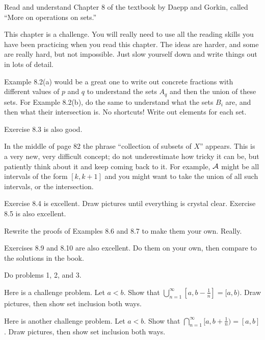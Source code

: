 
Read and understand Chapter 8 of the textbook by Daepp and Gorkin, called ``More on operations on sets.''

This chapter is a challenge.
You will really need to use all the reading skills you have been practicing when you read this chapter.
The ideas are harder, and some are really hard, but not impossible.
Just slow yourself down and write things out in lots of detail.

Example 8.2(a) would be a great one to write out concrete fractions with different values of $p$ and $q$ to understand the sets $A_q$ and then the union of these sets.  For Example 8.2(b), do the same to understand what the sets $B_i$ are, and then what their intersection is.  No shortcuts!  Write out elements for each set.

Exercise 8.3 is also good.

In the middle of page 82 the phrase ``collection of subsets of $X$'' appears.
This is a very new, very difficult concept; do not underestimate how tricky it can be, but patiently think about it and keep coming back to it.
For example, $\cal{A}$ might be all intervals of the form $[k,k+1]$ and you might want to take the union of all such intervals, or the intersection.

Exercise 8.4 is excellent.  Draw pictures until everything is crystal clear.
Exercise 8.5 is also excellent.

Rewrite the proofs of Examples 8.6 and 8.7 to make them your own.  Really.

Exercises 8.9 and 8.10 are also excellent.  Do them on your own, then compare to the solutions in the book.

Do problems 1, 2, and 3.

Here is a challenge problem.  Let $a < b$.  Show that $\bigcup_{n=1}^{\infty} [a, b-\frac{1}{n}] = [a,b)$.  Draw pictures, then show set inclusion both ways.

Here is another challenge problem.  Let $a < b$.  Show that $\bigcap_{n=1}^{\infty} [a,b+\frac{1}{n}) = [a,b]$.  Draw pictures, then show set inclusion both ways.

